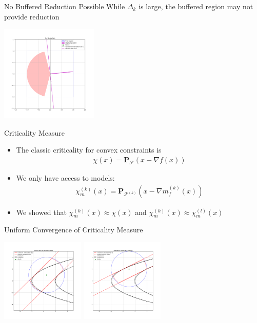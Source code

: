 \documentclass{beamer}
\newcommand{\feasible}{\mathcal F}
\newcommand{\feasiblek}{\mathcal F^{(k)}}
\newcommand{\proj}{\textbf{P}}
\begin{document}
\begin{frame}{No Buffered Reduction Possible}
	While $\Delta_k$ is large, the buffered region may not provide reduction
	\begin{center}
		\includegraphics[width=175px]{images/no_reduction.png}
	\end{center}
\end{frame}


\begin{frame}{Criticality Measure}
	\begin{itemize}
		\item The classic criticality for convex constraints is
\begin{align*}
\chi(x) = \proj_{\feasible}\left(x - \nabla f(x)\right)
\end{align*}
		\item We only have access to models:
\begin{align*}
\chi_m^{(k)}(x) = \proj_{\feasiblek}\left(x - \nabla m_f^{(k)}(x)\right)
\end{align*}
		\item We showed that $\chi_m^{(k)}(x) \approx \chi(x)$ and $\chi_m^{(k)}(x) \approx \chi_m^{(l)}(x)$
	\end{itemize}
\end{frame}



\begin{frame}{Uniform Convergence of Criticality Measure}
	\begin{center}
		\includegraphics[width=150px]{images/modeled_constraints_2.png}
		\includegraphics[width=150px]{images/modeled_constraints_3.png}
	\end{center}
\end{frame}
\end{document}
